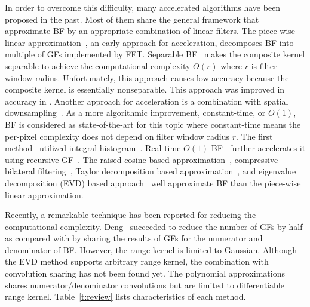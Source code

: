 \documentclass{article}
\begin{document}
In order to overcome this difficulty, many accelerated algorithms have been proposed in the past. Most of them share the general framework that approximate BF by an appropriate combination of linear filters. The piece-wise linear approximation~\cite{durand2002fast}, an early approach for acceleration, decomposes BF into multiple of GFs implemented by FFT.
Separable BF~\cite{pham2005separable} makes the composite kernel separable to achieve the computational complexity $O(r)$ where $r$ is filter window radius. Unfortunately, this approach causes low accuracy because the composite kernel is essentially nonseparable.
This approach was improved in accuracy in \cite{fukushima2015icassp}.
Another approach for acceleration is a combination with spatial downsampling~\cite{paris2006fast,chen2007real}.
As a more algorithmic improvement, constant-time, or $O(1)$, BF is considered as state-of-the-art for this topic where constant-time means the per-pixel complexity does not depend on filter window radius $r$.
The first method~\cite{porikli2008constant} utilized integral histogram~\cite{porikli2005integral}.
Real-time $O(1)$ BF~\cite{yang2009realtime} further accelerates it using recursive GF~\cite{derich1992recursively,deriche1993recursively}.
The raised cosine based approximation~\cite{chaudhury2011constant,chaudhury2011fast,chaudhury2013acceleration}, compressive bilateral filtering~\cite{sugimoto2015compressive,deng2017fast}, Taylor decomposition based approximation~\cite{chaudhury2015fast,chaudhury2016fast}, and eigenvalue decomposition (EVD) based approach~\cite{sugimoto2016consant} well approximate BF than the piece-wise linear approximation.

Recently, a remarkable technique has been reported for reducing the computational complexity. 
Deng~\cite{deng2017fast} succeeded to reduce the number of GFs by half as compared with \cite{sugimoto2015compressive} by sharing the results of GFs for the numerator and denominator of BF.
However, the range kernel is limited to Gaussian.
Although the EVD method \cite{sugimoto2016consant} supports arbitrary range kernel, the combination with convolution sharing has not been found yet.
The polynomial approximations~\cite{chaudhury2015fast,chaudhury2016fast} shares numerator/denominator convolutions but are limited to differentiable range kernel.
Table~\ref{t:review} lists characteristics of each method.
\end{document}
